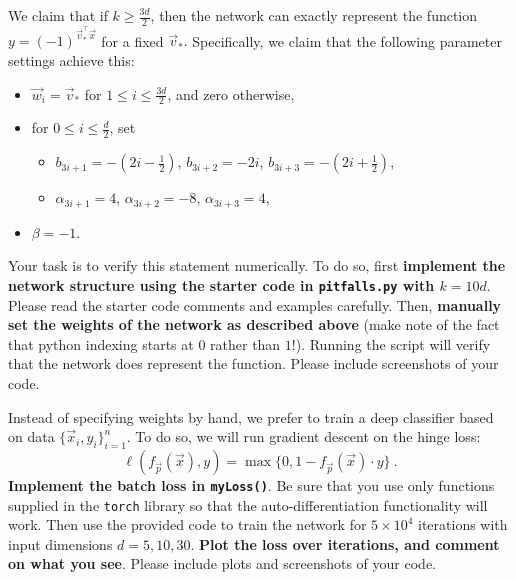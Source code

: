 \documentclass[preview]{standalone}
\begin{document}
\begin{Parts}
\Part 
We claim that if $k\geq \frac{3 d}{2}$, then the network can exactly represent the function $y = (-1)^{\vec v_*^\top \vec x}$ for a fixed $\vec v_*.$
Specifically, we claim that the following parameter settings achieve this: \begin{itemize}
	\item $\vec w_{i} = \vec v_*$ for $1\leq i\leq \frac{3d}{2}$, and zero otherwise,
	\item for $0\leq i\leq \frac{d}{2}$, set \begin{itemize}
		\item $b_{3i+1} = -(2i-\frac{1}{2})$, $b_{3i+2} = -2i$, $b_{3i+3} = -(2i+\frac{1}{2})$,
		\item $\alpha_{3i+1} = 4$, $\alpha_{3i+2} = -8$, $\alpha_{3i+3} = 4$,
	\end{itemize}
	\item $\beta=-1$.
\end{itemize}
Your task is to verify this statement numerically. To do so, first {\bf implement the network structure using the starter code in \texttt{pitfalls.py} with $k=10d$}. Please read the starter code comments and examples carefully. Then, {\bf manually set the weights of the network as described above} (make note of the fact that python indexing starts at $0$ rather than $1$!). Running the script will verify that the network does represent the function. Please include screenshots of your code.



\Part Instead of specifying weights by hand, we prefer to train a deep classifier based on data $\{\vec x_i, y_i\}_{i=1}^n$.
To do so, we will run gradient descent on the hinge loss: 
\[\ell(f_{\vec p}(\vec x), y) =\max\{0,1-f_{\vec p}(\vec x)\cdot y\}\:.\]
{\bf Implement the batch loss in \texttt{myLoss()}}. 
Be sure that you use only functions supplied in the \texttt{torch} library so that the auto-differentiation functionality will work.
Then use the provided code to train the network for $5\times10^4$ iterations with input dimensions $d=5,10,30$. {\bf Plot the loss over iterations, and comment on what you see}. Please include plots and screenshots of your code.




\end{Parts}
\end{document}

